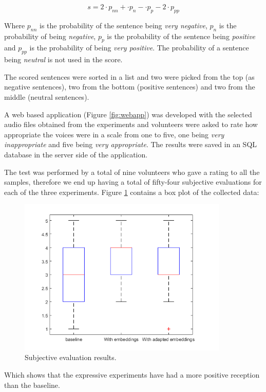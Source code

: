 \begin{equation}
    s = 2 \cdot p_{nn} + \cdot p_{n} - \cdot p_{p} - 2 \cdot p_{pp}
\end{equation}

Where $p_{nn}$ is the probability of the sentence being \textit{very negative}, $p_n$ is the probability of being \textit{negative}, $p_p$ is the probability of the sentence being \textit{positive} and $p_{pp}$ is the probability of being \textit{very positive}. The probability of a sentence being \textit{neutral} is not used in the score.

The scored sentences were sorted in a list and two were picked from the top (as negative sentences), two from the bottom (positive sentences) and two from the middle (neutral sentences).

A web based application (Figure \ref{fig:webapp}) was developed with the selected audio files obtained from the experiments and volunteers were asked to rate how appropriate the voices were in a scale from one to five, one being \textit{very inappropriate} and five being \textit{very appropriate}. The results were saved in an SQL database in the server side of the application.

The test was performed by a total of nine volunteers who gave a rating to all the samples, therefore we end up having a total of fifty-four subjective evaluations for each of the three experiments. Figure \ref{fig:boxplot0} contains a box plot of the collected data:

\begin{figure}[h]
    \centering
    \includegraphics[width=10cm]{figures/box0}
    \caption{Subjective evaluation results.}
    \label{fig:boxplot0}
\end{figure}

Which shows that the expressive experiments have had a more positive reception than the baseline.

